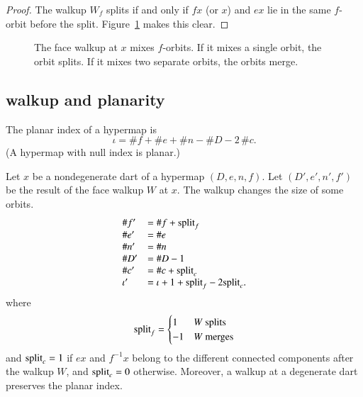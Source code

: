 \begin{proof} The walkup $W_f$ splits if and only if $f x$ 
(or $x$)
and $e x$ lie in the same $f$-orbit before the split. 
Figure~\ref{fig:split} makes this clear.
\end{proof}


\begin{figure}[htb]
  \centering
  \caption{The face walkup at $x$ mixes $f$-orbits.   If it mixes a single orbit,   the orbit splits. If it mixes   two separate    orbits, the orbits merge. }
  \label{fig:split}
\end{figure}


\subsection{walkup and planarity}

\begin{definition} The planar index of a hypermap is
$$\iota = \# f + \# e + \# n - \# D - 2\,\# c.$$
(A hypermap with null index is planar.)
\end{definition}

\begin{lemma} Let $x$ be a nondegenerate dart of a hypermap $(D,e,n,f)$. Let $(D',e',n',f')$ be the result of the face walkup $W$ at $x$.  
The walkup changes the size of some orbits.
    $$
    \begin{array}{lll}
    \# f' &=\# f +{\operatorname{split}}_f  \\  
    \# e'&=\# e \\
    \# n'&=\# n \\
    \# D'&=\# D - 1 \\
    \#c'&=\# c + {\operatorname{split}}_c\\
    \iota' &= \iota + 1+{\operatorname{split}}_f - 2{\operatorname{split}}_c.\\
    \end{array}
    $$
where
   $$
   {\operatorname{split}}_f = \begin{cases}
     1 & W \text{ splits }\\
    -1 & W \text{ merges}\\
   \end{cases}
   $$
and ${\operatorname{split}}_c=1$ if $e x$ and $f^{-1} x$ belong to the different connected components after the walkup $W$, and ${\operatorname{split}}_c=0$ otherwise. Moreover, a walkup at a degenerate dart preserves the planar index.
\end{lemma}

